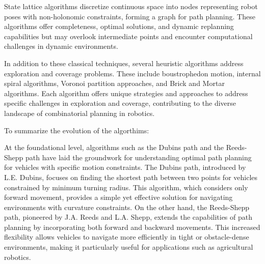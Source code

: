 \vspace*{6mm}

State lattice algorithms discretize continuous space into nodes representing robot poses with non-holonomic constraints, forming a graph for path planning. These algorithms offer completeness, optimal solutions, and dynamic replanning capabilities but may overlook intermediate points and encounter computational challenges in dynamic environments.

\vspace*{6mm}

In addition to these classical techniques, several heuristic algorithms address exploration and coverage problems. These include boustrophedon motion, internal spiral algorithms, Voronoi partition approaches, and Brick and Mortar algorithms. Each algorithm offers unique strategies and approaches to address specific challenges in exploration and coverage, contributing to the diverse landscape of combinatorial planning in robotics.





















\newpage

To summarize the evolution of the algorthims:

\vspace*{6mm}

At the foundational level, algorithms such as the Dubins path and the Reeds-Shepp path have laid the groundwork for understanding optimal path planning for vehicles with specific motion constraints. The Dubins path, introduced by L.E. Dubins, focuses on finding the shortest path between two points for vehicles constrained by minimum turning radius. This algorithm, which considers only forward movement, provides a simple yet effective solution for navigating environments with curvature constraints. On the other hand, the Reeds-Shepp path, pioneered by J.A. Reeds and L.A. Shepp, extends the capabilities of path planning by incorporating both forward and backward movements. This increased flexibility allows vehicles to navigate more efficiently in tight or obstacle-dense environments, making it particularly useful for applications such as agricultural robotics.

